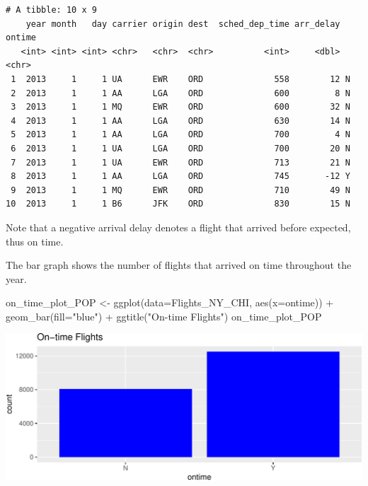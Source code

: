 \documentclass[
  letterpaper,
  DIV=11,
  numbers=noendperiod]{scrreprt}
\newenvironment{Shaded}{\begin{snugshade}}{\end{snugshade}}
\newcommand{\AttributeTok}[1]{\textcolor[rgb]{0.40,0.45,0.13}{#1}}
\newcommand{\FunctionTok}[1]{\textcolor[rgb]{0.28,0.35,0.67}{#1}}
\newcommand{\NormalTok}[1]{\textcolor[rgb]{0.00,0.23,0.31}{#1}}
\newcommand{\OtherTok}[1]{\textcolor[rgb]{0.00,0.23,0.31}{#1}}
\newcommand{\SpecialCharTok}[1]{\textcolor[rgb]{0.37,0.37,0.37}{#1}}
\newcommand{\StringTok}[1]{\textcolor[rgb]{0.13,0.47,0.30}{#1}}
\begin{document}
\begin{verbatim}
# A tibble: 10 x 9
    year month   day carrier origin dest  sched_dep_time arr_delay ontime
   <int> <int> <int> <chr>   <chr>  <chr>          <int>     <dbl> <chr> 
 1  2013     1     1 UA      EWR    ORD              558        12 N     
 2  2013     1     1 AA      LGA    ORD              600         8 N     
 3  2013     1     1 MQ      EWR    ORD              600        32 N     
 4  2013     1     1 AA      LGA    ORD              630        14 N     
 5  2013     1     1 AA      LGA    ORD              700         4 N     
 6  2013     1     1 UA      LGA    ORD              700        20 N     
 7  2013     1     1 UA      EWR    ORD              713        21 N     
 8  2013     1     1 AA      LGA    ORD              745       -12 Y     
 9  2013     1     1 MQ      EWR    ORD              710        49 N     
10  2013     1     1 B6      JFK    ORD              830        15 N     
\end{verbatim}

Note that a negative arrival delay denotes a flight that arrived before
expected, thus on time.

The bar graph shows the number of flights that arrived on time
throughout the year.

\begin{Shaded}
\begin{Highlighting}[]
\NormalTok{on\_time\_plot\_POP }\OtherTok{\textless{}{-}} \FunctionTok{ggplot}\NormalTok{(}\AttributeTok{data=}\NormalTok{Flights\_NY\_CHI, }\FunctionTok{aes}\NormalTok{(}\AttributeTok{x=}\NormalTok{ontime)) }\SpecialCharTok{+} 
                  \FunctionTok{geom\_bar}\NormalTok{(}\AttributeTok{fill=}\StringTok{"blue"}\NormalTok{) }\SpecialCharTok{+} 
                  \FunctionTok{ggtitle}\NormalTok{(}\StringTok{"On{-}time Flights"}\NormalTok{)}
\NormalTok{on\_time\_plot\_POP}
\end{Highlighting}
\end{Shaded}

\includegraphics{Ch3_files/figure-pdf/unnamed-chunk-5-1.pdf}
\end{document}
